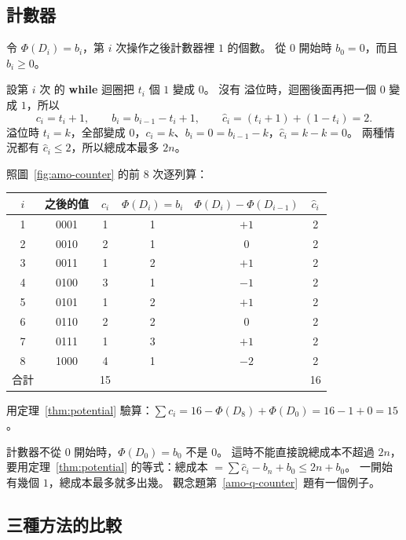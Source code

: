 \subsection{計數器}

令 $\Phi(D_i) = b_i$，第 $i$ 次操作之後計數器裡 $1$ 的個數。 從 $0$ 開始時
$b_0 = 0$，而且 $b_i \ge 0$。

設第 $i$ 次  的 \textbf{while} 迴圈把 $t_i$ 個 $1$ 變成 $0$。 沒有
溢位時，迴圈後面再把一個 $0$ 變成 $1$，所以
\[
c_i = t_i + 1, \qquad b_i = b_{i-1} - t_i + 1, \qquad
\hat{c}_i = (t_i + 1) + (1 - t_i) = 2.
\]
溢位時 $t_i = k$，全部變成 $0$，$c_i = k$、$b_i = 0 = b_{i-1} - k$，$\hat{c}_i = k
- k = 0$。 兩種情況都有 $\hat{c}_i \le 2$，所以總成本最多 $2n$。

照圖~\ref{fig:amo-counter} 的前 $8$ 次逐列算：

\begin{center}
\begin{tabular}{cccccc}
\toprule
$i$ & 之後的值 & $c_i$ & $\Phi(D_i) = b_i$ & $\Phi(D_i) - \Phi(D_{i-1})$ & $\hat{c}_i$ \\
\midrule
1 & 0001 & 1 & 1 & $+1$ & 2 \\
2 & 0010 & 2 & 1 & $0$ & 2 \\
3 & 0011 & 1 & 2 & $+1$ & 2 \\
4 & 0100 & 3 & 1 & $-1$ & 2 \\
5 & 0101 & 1 & 2 & $+1$ & 2 \\
6 & 0110 & 2 & 2 & $0$ & 2 \\
7 & 0111 & 1 & 3 & $+1$ & 2 \\
8 & 1000 & 4 & 1 & $-2$ & 2 \\
\midrule
合計 & & 15 & & & 16 \\
\bottomrule
\end{tabular}
\end{center}

用定理~\ref{thm:potential} 驗算：$\sum c_i = 16 - \Phi(D_8) + \Phi(D_0) = 16 - 1 + 0
= 15$。

計數器不從 $0$ 開始時，$\Phi(D_0) = b_0$ 不是 $0$。 這時不能直接說總成本不超過
$2n$，要用定理~\ref{thm:potential} 的等式：總成本 $= \sum \hat{c}_i - b_n + b_0 \le
2n + b_0$。 一開始有幾個 $1$，總成本最多就多出幾。 觀念題第~\ref{amo-q-counter}~題有一個例子。

\subsection{三種方法的比較}

